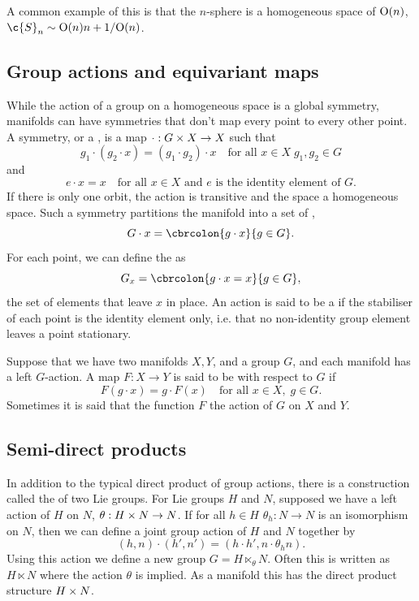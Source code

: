 A common example of this is that the \(n\)-sphere is a homogeneous space of \(\mathrm{O}(n)\), \(\c{S}_n \sim \groupO{n+1} / \groupO\).

\subsection{Group actions and equivariant maps}
While the action of a group on a homogeneous space is a global symmetry, manifolds can have symmetries that don't map every point to every other point.
A symmetry, or a , is a map \(\cdot: G\times X\to X\) such that 
\[g_1 \cdot(g_2 \cdot x) = (g_1 \cdot g_2) \cdot x \quad \text{for all } x\in X\; g_1, g_2 \in G\] and \[e \cdot x = x \quad \text{for all } x\in X \text{ and } e \text{ is the identity element of } G.\]
If there is only one orbit, the action is transitive and the space a homogeneous space.
Such a symmetry partitions the manifold into a set of , \[ G\cdot x = \cbrcolon{g\cdot x}{g\in G}.\]
For each point, we can define the  as \[G_x = \cbrcolon{g\cdot x = x}{g\in G},\] the set of elements that leave \(x\) in place.
An action is said to be a  if the stabiliser of each point is the identity element only, i.e. that no non-identity group element leaves a point stationary.

Suppose that we have two manifolds \(X, Y\), and a group \(G\), and each manifold has a left \(G\)-action.
A map \(F: X\to Y\) is said to be  with respect to \(G\) if \[F(g \cdot x) = g \cdot F(x) \quad \text{for all } x\in X, \; g\in G.\] Sometimes it is said that the function \(F\)  the action of \(G\) on \(X\) and \(Y\).

\subsection{Semi-direct products}
In addition to the typical direct product of group actions, there is a construction called the  of two Lie groups.
For Lie groups \(H\) and \(N\), supposed we have a left action of \(H\) on \(N\), \(\theta: H\times N \to N\).
If for all \(h\in H\) \(\theta_h: N\to N\) is an isomorphism on \(N\), then we can define a joint group action of \(H\) and \(N\) together by
\[
	(h, n) \cdot (h', n') = (h\cdot h', n \cdot \theta_h n)	
.\]
Using this action we define a new group \(G = H \ltimes_\theta N\).
Often this is written as \(H\ltimes N\) where the action \(\theta\) is implied.
As a manifold this has the direct product structure \(H \times N\).

